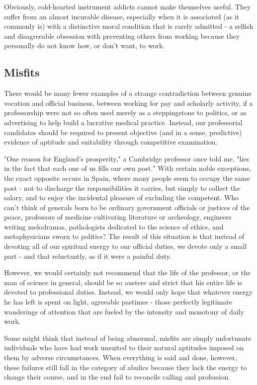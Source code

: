 \documentclass{article}
\begin{document}
Obviously, cold-hearted instrument addicts cannot make themselves useful. They suffer from an almost incurable disease, especially when it is associated (as it commonly is) with a distinctive moral condition that is rarely admitted - a selfish and disagreeable obsession with preventing others from working because they personally do not know how, or don’t want, to work.

\subsection*{Misfits}

There would be many fewer examples of a strange contradiction between genuine vocation and official business, between working for pay and scholarly activity, if a professorship were not so often used merely as a steppingstone to politics, or as advertising to help build a lucrative medical practice. Instead, our professorial candidates should be required to present objective (and in a sense, predictive) evidence of aptitude and suitability through competitive examination.

"One reason for England’s prosperity," a Cambridge professor once told me, "lies in the fact that each one of us fills our own post." With certain noble exceptions, the exact opposite occurs in Spain, where many people seem to occupy the same post - not to discharge the responsibilities it carries, but simply to collect the salary, and to enjoy the incidental pleasure of excluding the competent. Who can’t think of generals born to be ordinary government officials or justices of the peace, professors of medicine cultivating literature or archeology, engineers writing melodramas, pathologists dedicated to the science of ethics, and metaphysicians sworn to politics? The result of this situation is that instead of devoting all of our spiritual energy to our official duties, we devote only a small part - and that reluctantly, as if it were a painful duty.

However, we would certainly not recommend that the life of the professor, or the man of science in general, should be so austere and strict that his entire life is devoted to professional duties. Instead, we would only hope that whatever energy he has left is spent on light, agreeable pastimes - those perfectly legitimate wanderings of attention that are fueled by the intensity and monotony of daily work.

Some might think that instead of being abnormal, misfits are simply unfortunate individuals who have had work unsuited to their natural aptitudes imposed on them by adverse circumstances. When everything is said and done, however, these failures still fall in the category of abulics because they lack the energy to change their course, and in the end fail to reconcile calling and profession.
\end{document}
